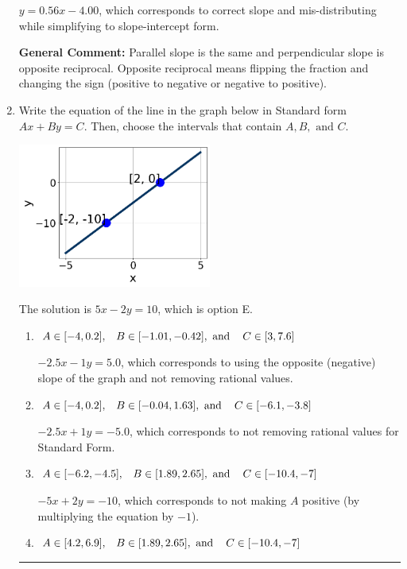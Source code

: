 \documentclass{extbook}[14pt]
\newcommand{\litem}[1]{\item #1

\rule{\textwidth}{0.4pt}}
\begin{document}
\begin{enumerate}
{\begin{enumerate}[label=\Alph*.]
 $y = 0.56x - 4.00$, which corresponds to correct slope and mis-distributing while simplifying to slope-intercept form.
\end{enumerate}

\textbf{General Comment:} Parallel slope is the same and perpendicular slope is opposite reciprocal. Opposite reciprocal means flipping the fraction and changing the sign (positive to negative or negative to positive).
}
\litem{
Write the equation of the line in the graph below in Standard form $Ax+By=C$. Then, choose the intervals that contain $A, B, \text{ and } C$.

\begin{center}
    \includegraphics[width=0.5\textwidth]{../Figures/linearGraphToStandardB.png}
\end{center}


The solution is \( 5x - 2y = 10 \), which is option E.\begin{enumerate}[label=\Alph*.]
\item \( A \in [-4, 0.2], \hspace{3mm} B \in [-1.01, -0.42], \text{ and } \hspace{3mm} C \in [3, 7.6] \)

 $-2.5x - 1y = 5.0$, which corresponds to using the opposite (negative) slope of the graph and not removing rational values.
\item \( A \in [-4, 0.2], \hspace{3mm} B \in [-0.04, 1.63], \text{ and } \hspace{3mm} C \in [-6.1, -3.8] \)

 $-2.5x + 1y = -5.0$, which corresponds to not removing rational values for Standard Form.
\item \( A \in [-6.2, -4.5], \hspace{3mm} B \in [1.89, 2.65], \text{ and } \hspace{3mm} C \in [-10.4, -7] \)

 $-5x + 2y = -10$, which corresponds to not making $A$ positive (by multiplying the equation by $-1$).
\item \( A \in [4.2, 6.9], \hspace{3mm} B \in [1.89, 2.65], \text{ and } \hspace{3mm} C \in [-10.4, -7] \)


\end{enumerate}}
\end{enumerate}
\end{document}
